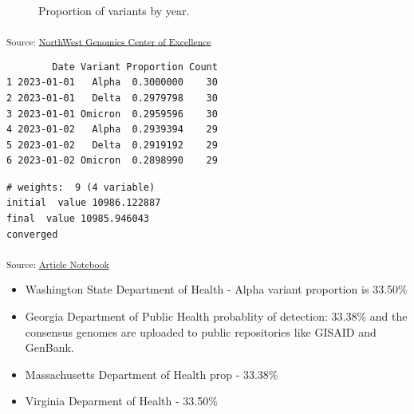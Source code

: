 \documentclass[
  twocolumn]{article}
\providecommand{\tightlist}{%
  \setlength{\itemsep}{0pt}\setlength{\parskip}{0pt}}\usepackage{longtable,booktabs,array}
\begin{document}
\begin{figure}[H]


\caption{\label{fig-countprop}Proportion of variants by year.}

\end{figure}%

\textsubscript{Source:
\href{https://coe-test-org.github.io/sitrep-demo/notebooks/nwcoe-preview.html\#cell-fig-countprop}{NorthWest
Genomics Center of Excellence}}

\begin{verbatim}
        Date Variant Proportion Count
1 2023-01-01   Alpha  0.3000000    30
2 2023-01-01   Delta  0.2979798    30
3 2023-01-01 Omicron  0.2959596    30
4 2023-01-02   Alpha  0.2939394    29
5 2023-01-02   Delta  0.2919192    29
6 2023-01-02 Omicron  0.2898990    29
\end{verbatim}

\begin{verbatim}
# weights:  9 (4 variable)
initial  value 10986.122887 
final  value 10985.946043 
converged
\end{verbatim}

\textsubscript{Source:
\href{https://coe-test-org.github.io/sitrep-demo/index.qmd.html}{Article
Notebook}}

\begin{itemize}
\tightlist
\item
  Washington State Department of Health - Alpha variant proportion is
  33.50\%
\item
  Georgia Department of Public Health probablity of detection: 33.38\%
  and the consensus genomes are uploaded to public repositories like
  GISAID and GenBank.
\item
  Massachusetts Department of Health prop - 33.38\%
\item
  Virginia Deparment of Health - 33.50\%
\end{itemize}
\end{document}
